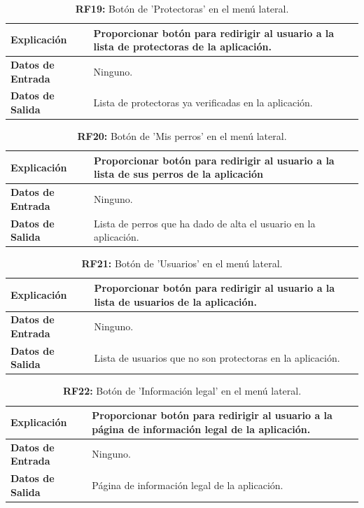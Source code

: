\documentclass[a4paper, 12pt]{article}
\begin{document}
\begin{table}[H]
\captionsetup{justification=raggedright,singlelinecheck=false}
\caption{\textbf{RF19:} Botón de 'Protectoras' en el menú lateral.}
\label{tab:RF19}
	\begin{tabular}{|m{5cm}|m{10cm}|}
	\hline
	\textbf{Explicación} & Proporcionar botón para redirigir al usuario a la lista de protectoras de la aplicación. \\ 
	\hline
	\textbf{Datos de Entrada} &  Ninguno. \\ 
	\hline
	\textbf{Datos de Salida} &  Lista de protectoras ya verificadas en la aplicación. \\ 
	\hline
\end{tabular}
\end{table}

\begin{table}[H]
\captionsetup{justification=raggedright,singlelinecheck=false}
\caption{\textbf{RF20:} Botón de 'Mis perros' en el menú lateral.}
\label{tab:RF20}
	\begin{tabular}{|m{5cm}|m{10cm}|}
	\hline
	\textbf{Explicación} & Proporcionar botón para redirigir al usuario a la lista de sus perros de la aplicación \\ 
	\hline
	\textbf{Datos de Entrada} &  Ninguno. \\ 
	\hline
	\textbf{Datos de Salida} &  Lista de perros que ha dado de alta el usuario en la aplicación. \\ 
	\hline
\end{tabular}
\end{table}

\begin{table}[H]
\captionsetup{justification=raggedright,singlelinecheck=false}
\caption{\textbf{RF21:} Botón de 'Usuarios' en el menú lateral.}
\label{tab:RF21}
	\begin{tabular}{|m{5cm}|m{10cm}|}
	\hline
	\textbf{Explicación} & Proporcionar botón para redirigir al usuario a la lista de usuarios de la aplicación. \\ 
	\hline
	\textbf{Datos de Entrada} &  Ninguno. \\ 
	\hline
	\textbf{Datos de Salida} &  Lista de usuarios que no son protectoras en la aplicación. \\ 
	\hline
\end{tabular}
\end{table}

\begin{table}[H]
\captionsetup{justification=raggedright,singlelinecheck=false}
\caption{\textbf{RF22:} Botón de 'Información legal' en el menú lateral.}
\label{tab:RF22}
	\begin{tabular}{|m{5cm}|m{10cm}|}
	\hline
	\textbf{Explicación} & Proporcionar botón para redirigir al usuario a la página de información legal de la aplicación. \\ 
	\hline
	\textbf{Datos de Entrada} &  Ninguno. \\ 
	\hline
	\textbf{Datos de Salida} &  Página de información legal de la aplicación. \\ 
	\hline
\end{tabular}
\end{table}
\end{document}

